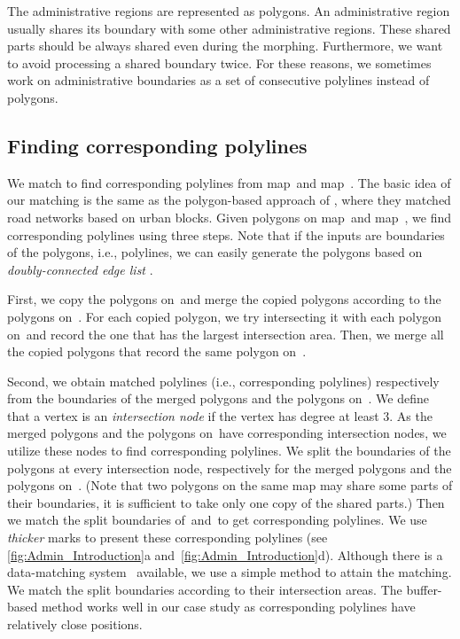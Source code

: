 The administrative regions are represented as polygons. 
An administrative region usually shares its boundary 
with some other administrative regions. 
These shared parts should be always shared even during the morphing.
Furthermore, we want to avoid processing a shared boundary twice.
For these reasons, we sometimes work on administrative boundaries
as a set of consecutive polylines instead of polygons.



\subsection{Finding corresponding polylines}
\label{sec:Admin_Preprocessing}

We match to find corresponding polylines 
from map~\ml and map~\ms.
The basic idea of our matching is the same as the polygon-based 
approach of \parencite{Fan2016Matching}, where they matched road 
networks based on urban blocks.
Given polygons on map~\ml and map~\ms, 
we find corresponding polylines using three steps. 
Note that if the inputs are boundaries of the polygons, 
i.e., polylines, 
we can easily generate the polygons 
based on \emph{doubly-connected edge list} 
\parencite[]{deBerg2008}.

First, we copy the polygons on~\ml and 
merge the copied polygons according to the polygons on~\ms. 
For each copied polygon, 
we try intersecting it with each polygon on~\ms and 
record the one that has the largest intersection area. 
Then, we merge all the copied 
polygons that record the same polygon on~\ms.

Second, we obtain matched polylines 
(i.e., corresponding polylines)
respectively from the boundaries of the 
merged polygons and the polygons on~\ms. 
We define that a vertex is an \emph{intersection node} 
if the vertex has degree at least 3. 
As the merged polygons and the polygons on~\ms have corresponding intersection nodes, we utilize these 
nodes to find corresponding polylines. 
We split the boundaries of the 
polygons at every intersection node, 
respectively for the merged polygons and the 
polygons on~\ms. 
(Note that two polygons on the same map may share some parts of 
their boundaries, it is sufficient to take only one copy of the shared parts.) 
Then we match the split boundaries of~\ml and~\ms  to get 
corresponding polylines. 
We use \emph{thicker} marks to 
present these corresponding polylines 
(see \figs\ref{fig:Admin_Introduction}a
and~\ref{fig:Admin_Introduction}d). 
Although there is a data-matching 
system~\parencite{Mustiere2008} 
available, we use a simple method to attain the matching. 
We match the split boundaries 
according to their intersection areas. 
The buffer-based method works well in our case study as 
corresponding polylines have relatively close positions.

